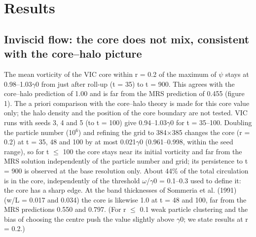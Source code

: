 \documentclass[11pt]{article}
\begin{document}
\section{Results}

\subsection{Inviscid flow: the core does not mix, consistent with the core--halo picture}
The mean vorticity of the VIC core within r = 0.2 of the maximum of $\psi{}$ stays at 0.98--1.03$\gamma{}$0 from just after roll-up (t = 35) to t = 900. This agrees with the core--halo prediction of 1.00 and is far from the MRS prediction of 0.455 (figure 1). The a priori comparison with the core--halo theory is made for this core value only; the halo density and the position of the core boundary are not tested. VIC runs with seeds 3, 4 and 5 (to t = 100) give 0.94--1.03$\gamma{}$0 for t = 35--100. Doubling the particle number (10$^{6}$) and refining the grid to 384$\times{}$385 changes the core (r = 0.2) at t = 35, 48 and 100 by at most 0.021$\gamma{}$0 (0.961--0.998, within the seed range), so for t $\le{}$ 100 the core stays near its initial vorticity and far from the MRS solution independently of the particle number and grid; its persistence to t = 900 is observed at the base resolution only. About 44\% of the total circulation is in the core, independently of the threshold $\omega{}$/$\gamma{}$0 = 0.1--0.3 used to define it: the core has a sharp edge. At the band thicknesses of Sommeria et al. (1991) (w/L = 0.017 and 0.034) the core is likewise 1.0 at t = 48 and 100, far from the MRS predictions 0.550 and 0.797. (For r $\le{}$ 0.1 weak particle clustering and the bias of choosing the centre push the value slightly above $\gamma{}$0; we state results at r = 0.2.)
\end{document}
